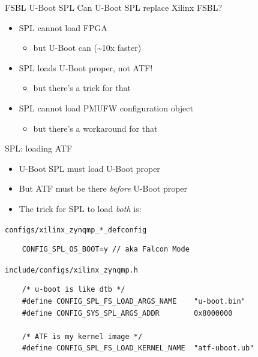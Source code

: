 \documentclass[xetex,table]{beamer}
\begin{document}
\begin{frame}{FSBL \textrightarrow{} U-Boot SPL}
  Can U-Boot SPL replace Xilinx FSBL?
  \begin{itemize}
  \pause\item SPL cannot load FPGA
    \begin{itemize}
    \item but U-Boot can (\textasciitilde{}10x faster)
    \end{itemize}
  \pause\item SPL loads U-Boot proper, not ATF!
    \begin{itemize}
    \item but there's a trick for that
    \end{itemize}
  \pause\item SPL cannot load PMUFW configuration object
    \begin{itemize}
    \item but there's a workaround for that
    \end{itemize}
  \end{itemize}
\end{frame}

\begin{frame}[fragile]{SPL: loading ATF}
  \begin{itemize}
  \item U-Boot SPL must load U-Boot proper
  \item But ATF must be there {\em before} U-Boot
    proper
  \item The trick for SPL to load {\em both} is:
  \end{itemize}

  \pause
  {\tt configs/xilinx\_zynqmp\_*\_defconfig}
  \begin{verbatim}
    CONFIG_SPL_OS_BOOT=y // aka Falcon Mode
  \end{verbatim}

  \pause
  {\tt include/configs/xilinx\_zynqmp.h}
  \begin{verbatim}
    /* u-boot is like dtb */
    #define CONFIG_SPL_FS_LOAD_ARGS_NAME    "u-boot.bin"
    #define CONFIG_SYS_SPL_ARGS_ADDR        0x8000000

    /* ATF is my kernel image */
    #define CONFIG_SPL_FS_LOAD_KERNEL_NAME  "atf-uboot.ub"
  \end{verbatim}
\end{frame}
\end{document}
